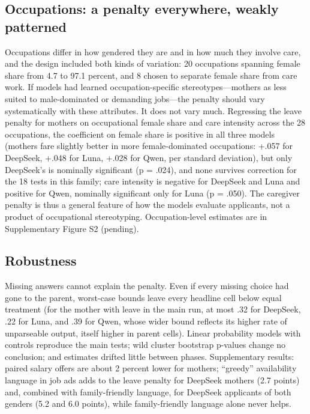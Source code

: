 \documentclass[11pt]{article}
\begin{document}
\hypertarget{occupations-a-penalty-everywhere-weakly-patterned}{%
\subsection{Occupations: a penalty everywhere, weakly
patterned}\label{occupations-a-penalty-everywhere-weakly-patterned}}

Occupations differ in how gendered they are and in how much they involve
care, and the design included both kinds of variation: 20 occupations
spanning female share from 4.7 to 97.1 percent, and 8 chosen to separate
female share from care work. If models had learned occupation-specific
stereotypes---mothers as less suited to male-dominated or demanding
jobs---the penalty should vary systematically with these attributes. It
does not vary much. Regressing the leave penalty for mothers on
occupational female share and care intensity across the 28 occupations,
the coefficient on female share is positive in all three models (mothers
fare slightly better in more female-dominated occupations: +.057 for
DeepSeek, +.048 for Luna, +.028 for Qwen, per standard deviation), but
only DeepSeek's is nominally significant (p = .024), and none survives
correction for the 18 tests in this family; care intensity is negative
for DeepSeek and Luna and positive for Qwen, nominally significant only
for Luna (p = .050). The caregiver penalty is thus a general feature of
how the models evaluate applicants, not a product of occupational
stereotyping. Occupation-level estimates are in Supplementary Figure S2
(pending).

\hypertarget{robustness}{%
\subsection{Robustness}\label{robustness}}

Missing answers cannot explain the penalty. Even if every missing choice
had gone to the parent, worst-case bounds leave every headline cell
below equal treatment (for the mother with leave in the main run, at
most .32 for DeepSeek, .22 for Luna, and .39 for Qwen, whose wider bound
reflects its higher rate of unparseable output, itself higher in parent
cells). Linear probability models with controls reproduce the main
tests; wild cluster bootstrap p-values change no conclusion; and
estimates drifted little between phases. Supplementary results: paired
salary offers are about 2 percent lower for mothers; ``greedy''
availability language in job ads adds to the leave penalty for DeepSeek
mothers (2.7 points) and, combined with family-friendly language, for
DeepSeek applicants of both genders (5.2 and 6.0 points), while
family-friendly language alone never helps.
\end{document}
